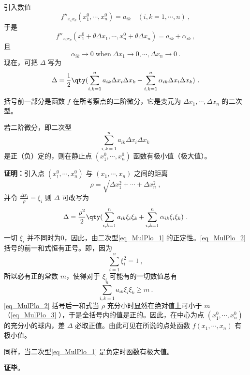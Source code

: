 引入数值
\begin{equation}
f''_{x_ix_k}(x_1^0,\cdots,x_n^0)=a_{ik}\quad (i,k=1,\cdots,n)~,
\end{equation}
于是
\begin{equation}
f''_{x_ix_k}(x_1^0+\theta\Delta x_1,\cdots,x_n^0+\theta\Delta x_n)=a_{ik}+\alpha_{ik}~,
\end{equation}
且
\begin{equation}\label{eq_MulPlo_3}
\alpha_{ik}\rightarrow 0\;\mathrm{when}\;\Delta x_1\rightarrow0,\cdots,\Delta x_n\rightarrow0~.
\end{equation}
现在，可把 $\Delta$ 写为
\begin{equation}
\Delta=\frac{1}{2}\qty(\sum_{i,k=1}^na_{ik}\Delta x_i\Delta x_k+\sum_{i,k=1}^n\alpha_{ik}\Delta x_i\Delta x_k )~.
\end{equation}
括号前一部分是函数 $f$ 在所考察点的二阶微分，它是变元为 $\Delta x_1,\cdots,\Delta x_n$ 的二次型。
\begin{theorem}{}
若二阶微分，即二次型
\begin{equation}\label{eq_MulPlo_1}
\sum_{i,k=1}^na_{ik}\Delta x_i\Delta x_k~
\end{equation}
是正（负）定的，则在静止点 $(x_1^0,\cdots,x_n^0)$ 函数有极小值（极大值）。
\end{theorem}
\textbf{证明：}引入点 $(x_1^0,\cdots,x_n^0)$ 与 $(x_1,\cdots,x_n)$ 之间的距离
\begin{equation}
\rho=\sqrt{\Delta x_1^2+\cdots+\Delta x_n^2}~,
\end{equation}
 并令 $\frac{\Delta x_i}{\rho}=\xi_i$
 则 $\Delta$ 可改写为
 \begin{equation}\label{eq_MulPlo_2}
 \Delta=\frac{\rho^2}{2}\qty(\sum_{i,k=1}^na_{ik}\xi_i\xi_k+\sum_{i,k=1}^n\alpha_{ik} \xi_i\xi_k)~.
 \end{equation}
 一切 $\xi_i$ 并不同时为0，因此，由二次型\autoref{eq_MulPlo_1} 的正定性。\autoref{eq_MulPlo_2} 括号的前一和式恒有正号。即，因为
 \begin{equation}
 \sum_{i=1}^n\xi_i^2=1~,
 \end{equation}
 所以必有正的常数 $m$，使得对于 $\xi_i$ 可能有的一切数值总有
 \begin{equation}
 \sum_{i,k=1}^na_{ik}\xi_i\xi_k\geq m~.
 \end{equation}
 \autoref{eq_MulPlo_2} 括号后一和式当 $\rho$ 充分小时显然在绝对值上可小于 $m$（\autoref{eq_MulPlo_3} ），于是全括号内的值是正的。因此，在中心为点 $(x_1^0,\cdots,x_n^0)$ 的充分小的球内，差 $\Delta$ 必取正值。由此可见在所说的点处函数 $f(x_1,\cdots,x_n)$ 有极小值。

 同样，当二次型\autoref{eq_MulPlo_1} 是负定时函数有极大值。

\textbf{证毕}。

